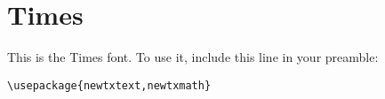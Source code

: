 \documentclass{article}
\begin{document}
\section*{Times}
This is the Times font.
To use it, include this line in your preamble:
\begin{verbatim}
\usepackage{newtxtext,newtxmath}
\end{verbatim}


\end{document}
